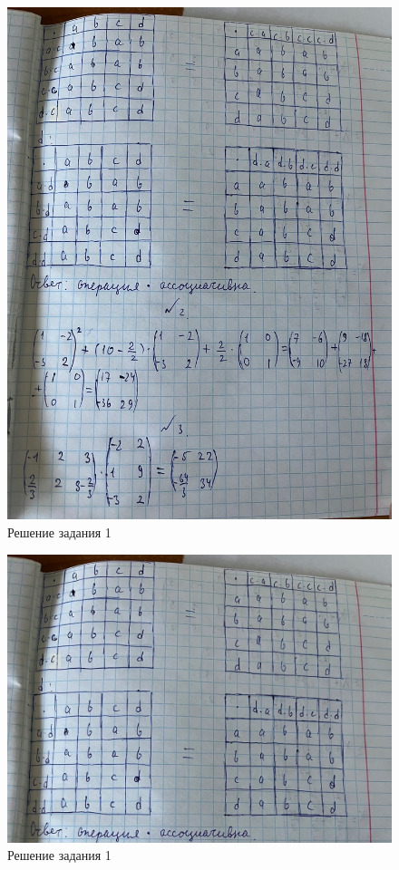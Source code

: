 \documentclass[spec, och, labwork]{shiza}
\begin{document}
\begin{figure}[H]
    \centering      %
    \includegraphics[width=1.\textwidth]{13}
    \caption{Решение задания 1}
    \label{fig:image1}
\end{figure}

\begin{figure}[H]
    \centering      %
    \includegraphics[width=1.\textwidth]{14}
    \caption{Решение задания 1}
    \label{fig:image1}
\end{figure}
\end{document}
